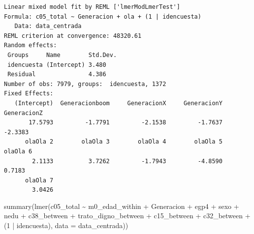 \documentclass[
  spanish,
  a4paper,
  oneside]{scrbook}
\newenvironment{Shaded}{\begin{snugshade}}{\end{snugshade}}
\newcommand{\AttributeTok}[1]{\textcolor[rgb]{0.40,0.45,0.13}{#1}}
\newcommand{\DecValTok}[1]{\textcolor[rgb]{0.68,0.00,0.00}{#1}}
\newcommand{\FunctionTok}[1]{\textcolor[rgb]{0.28,0.35,0.67}{#1}}
\newcommand{\NormalTok}[1]{\textcolor[rgb]{0.00,0.23,0.31}{#1}}
\newcommand{\SpecialCharTok}[1]{\textcolor[rgb]{0.37,0.37,0.37}{#1}}
\begin{document}
\begin{verbatim}
Linear mixed model fit by REML ['lmerModLmerTest']
Formula: c05_total ~ Generacion + ola + (1 | idencuesta)
   Data: data_centrada
REML criterion at convergence: 48320.61
Random effects:
 Groups     Name        Std.Dev.
 idencuesta (Intercept) 3.480   
 Residual               4.386   
Number of obs: 7979, groups:  idencuesta, 1372
Fixed Effects:
   (Intercept)  Generacionboom     GeneracionX     GeneracionY     GeneracionZ  
       17.5793         -1.7791         -2.1538         -1.7637         -2.3383  
      olaOla 2        olaOla 3        olaOla 4        olaOla 5        olaOla 6  
        2.1133          3.7262         -1.7943         -4.8590          0.7183  
      olaOla 7  
        3.0426  
\end{verbatim}

\begin{Shaded}
\begin{Highlighting}[]
     \FunctionTok{summary}\NormalTok{(}\FunctionTok{lmer}\NormalTok{(c05\_total }\SpecialCharTok{\textasciitilde{}}\NormalTok{ m0\_edad\_within }\SpecialCharTok{+}
\NormalTok{                       Generacion }\SpecialCharTok{+}\NormalTok{ egp4 }\SpecialCharTok{+}\NormalTok{ sexo }\SpecialCharTok{+}\NormalTok{ nedu }\SpecialCharTok{+}
\NormalTok{                       c38\_between }\SpecialCharTok{+}
\NormalTok{                       trato\_digno\_between }\SpecialCharTok{+}\NormalTok{ c15\_between }\SpecialCharTok{+}\NormalTok{ c32\_between }\SpecialCharTok{+}
\NormalTok{                       (}\DecValTok{1} \SpecialCharTok{|}\NormalTok{ idencuesta), }\AttributeTok{data =}\NormalTok{ data\_centrada))}
\end{Highlighting}
\end{Shaded}
\end{document}
